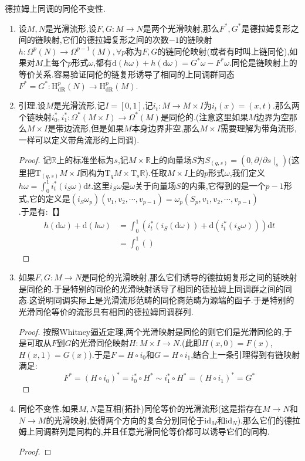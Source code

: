 德拉姆上同调的同伦不变性.
\begin{enumerate}
	\item 设$M,N$是光滑流形,设$F,G:M\to N$是两个光滑映射,那么$F^*,G^*$是德拉姆复形之间的链映射,它们的德拉姆复形之间的次数$-1$的链映射$h:\Omega^p(N)\to\Omega^{p-1}(M),\forall p$称为$F,G$的链同伦映射(或者有时叫上链同伦),如果对$M$上每个$p$形式$\omega$,都有$\mathrm{d}(h\omega)+h(\mathrm{d}\omega)=G^*\omega-F^*\omega$.同伦是链映射上的等价关系.容易验证同伦的链复形诱导了相同的上同调群同态$F^*=G^*:\mathrm{H}^p_{\mathrm{dR}}(N)\to\mathrm{H}^p_{\mathrm{dR}}(M)$.
	\item 引理.设$M$是光滑流形,记$I=[0,1]$,记$i_t:M\to M\times I$为$i_t(x)=(x,t)$.那么两个链映射$i_0^*,i_1^*:\Omega^*(M\times I)\to\Omega^*(M)$是同伦的.(注意这里如果$M$边界为空那么$M\times I$是带边流形,但是如果$M$本身边界非空,那么$M\times I$需要理解为带角流形,一样可以定义带角流形的上同调).
	\begin{proof}
		
		记$\mathbb{R}$上的标准坐标为$s$,记$M\times\mathbb{R}$上的向量场$S$为$S_{(q,s)}=(0,\partial/\partial s\mid_s)$(这里把$\mathrm{T}_{(q,s)}M\times I$同构为$\mathrm{T}_qM\times\mathrm{T}_s\mathbb{R}$).任取$M\times I$上的$p$形式$\omega$,我们定义$h\omega=\int_0^1i_t^*(i_S\omega)\mathrm{d}t$.这里$i_S\omega$是$\omega$关于向量场$S$的内乘,它得到的是一个$p-1$形式,它的定义是$(i_S\omega_p)(v_1,v_2,\cdots,v_{p-1})=\omega_p(S_p,v_1,v_2,\cdots,v_{p-1})$.于是有:【】
		\begin{align*}
		h(\mathrm{d}\omega)+\mathrm{d}(h\omega)&=\int_0^1\left(i_t^*(i_S(\mathrm{d}\omega))+\mathrm{d}(i_t^*(i_S\omega))\right)\mathrm{d}t\\&=\int_0^1\left(\right)
		\end{align*}
	\end{proof}
    \item 如果$F,G:M\to N$是同伦的光滑映射,那么它们诱导的德拉姆复形之间的链映射是同伦的.于是特别的同伦的光滑映射诱导了相同的德拉姆上同调群之间的同态.这说明同调实际上是光滑流形范畴的同伦商范畴为源端的函子.于是特别的光滑同伦等价的流形具有相同的德拉姆同调群列.
    \begin{proof}
    	
    	按照Whitney逼近定理,两个光滑映射是同伦的则它们是光滑同伦的,于是可取从$F$到$G$的光滑同伦映射$H:M\times I\to N$.(此即$H(x,0)=F(x)$,$H(x,1)=G(x)$).于是$F=H\circ i_0$和$G=H\circ i_1$,结合上一条引理得到有链映射满足:
    	$$F^*=(H\circ i_0)^*=i_0^*\circ H^*\sim i_1^*\circ H^*=(H\circ i_1)^*=G^*$$
    \end{proof}
    \item 同伦不变性.如果$M,N$是互相(拓扑)同伦等价的光滑流形(这是指存在$M\to N$和$N\to M$的光滑映射,使得两个方向的复合分别同伦于$\mathrm{id}_M$和$\mathrm{id}_N$).那么它们的德拉姆上同调群列是同构的,并且任意光滑同伦等价都可以诱导它们的同构.
    \begin{proof}
    	

\end{proof}
\end{enumerate}
